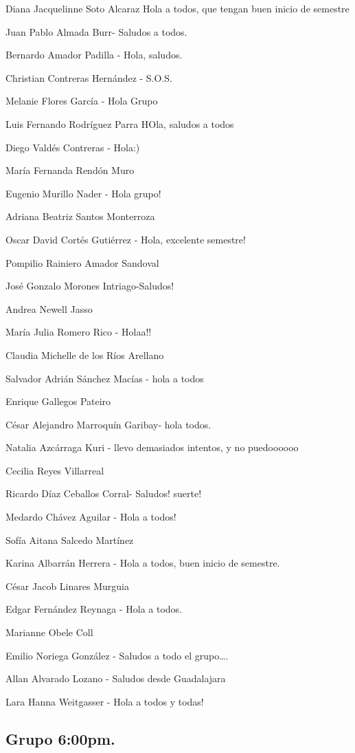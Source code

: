 \documentclass[12pt,halfline,a4paper,]{ouparticle}
\begin{document}
Diana Jacquelinne Soto Alcaraz Hola a todos, que tengan buen inicio de
semestre

Juan Pablo Almada Burr- Saludos a todos.

Bernardo Amador Padilla - Hola, saludos.

Christian Contreras Hernández - S.O.S.

Melanie Flores García - Hola Grupo

Luis Fernando Rodríguez Parra HOla, saludos a todos

Diego Valdés Contreras - Hola:)

María Fernanda Rendón Muro

Eugenio Murillo Nader - Hola grupo!

Adriana Beatriz Santos Monterroza

Oscar David Cortés Gutiérrez - Hola, excelente semestre!

Pompilio Rainiero Amador Sandoval

José Gonzalo Morones Intriago-Saludos!

Andrea Newell Jasso

María Julia Romero Rico - Holaa!!

Claudia Michelle de los Ríos Arellano

Salvador Adrián Sánchez Macías - hola a todos

Enrique Gallegos Pateiro

César Alejandro Marroquín Garibay- hola todos.

Natalia Azcárraga Kuri - llevo demasiados intentos, y no puedoooooo

Cecilia Reyes Villarreal

Ricardo Díaz Ceballos Corral- Saludos! suerte!

Medardo Chávez Aguilar - Hola a todos!

Sofía Aitana Salcedo Martínez

Karina Albarrán Herrera - Hola a todos, buen inicio de semestre.

César Jacob Linares Murguia

Edgar Fernández Reynaga - Hola a todos.

Marianne Obele Coll

Emilio Noriega González - Saludos a todo el grupo\ldots.

Allan Alvarado Lozano - Saludos desde Guadalajara

Lara Hanna Weitgasser - Hola a todos y todas!

\hypertarget{grupo-600pm.}{%
\subsection{Grupo 6:00pm.}\label{grupo-600pm.}}
\end{document}
